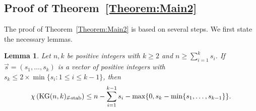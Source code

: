 \documentclass[preprint,12pt,3p]{elsarticle}
\newtheorem{lemma}[theorem]{Lemma}
\begin{document}
\subsection{Proof of Theorem~\ref{Theorem:Main2}}



The proof of Theorem~\ref{Theorem:Main2} is based on several steps. We first state the necessary lemmas.


\begin{lemma}\label{Lemma: 1 coloring}
  Let $n, k$ be positive integers with $k \geq 2$ and $n \geq \sum_{i=1}^{k} s_i$. If $\vec{s}=(s_1, \ldots, s_k)$ is a vector of positive integers with $s_{k}\leq 2\times\min\{s_i: 1\leq i\leq k-1\}$, then
  \[
   \chi\left(\mathrm{KG}(n, k)_{\vec{s}\textup{-stab}}\right)\leq n - \sum_{i=1}^{k-1} s_i - \max\{0, s_k-\min\{s_1, \ldots, s_{k-1}\} \}.
  \]
\end{lemma}
\end{document}
